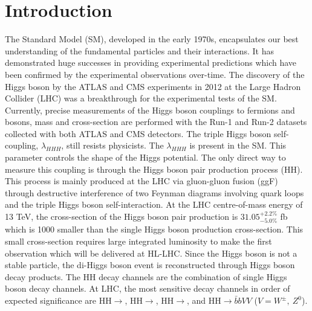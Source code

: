 \chapter{Introduction}
\label{Intro}
The Standard Model (SM), developed in the early 1970s, encapsulates our best understanding of the fundamental particles and their interactions. It has demonstrated huge successes in providing experimental predictions which have been confirmed by the experimental observations over-time. The discovery of the Higgs boson by the ATLAS and CMS experiments in 2012 at the Large Hadron Collider (LHC) was a breakthrough for the experimental tests of the SM. Currently, precise measurements of the Higgs boson couplings to fermions and bosons, mass and cross-section are performed with the Run-1 and Run-2 datasets collected with both ATLAS and CMS detectors. The triple Higgs boson self-coupling, $\lambda_{HHH}$, still resists physicists. The $\lambda_{HHH}$ is present in the SM. This parameter controls the shape of the Higgs potential. The only direct way to measure this coupling is through the Higgs boson pair production process (HH). This process is mainly produced at the LHC via gluon-gluon fusion (ggF) through destructive interference of two Feynman diagrams involving quark loops and the triple Higgs boson self-interaction. At the LHC centre-of-mass energy of 13 TeV, the cross-section of the Higgs boson pair production is $31.05_{-5.0\%}^{+2.2\%}$ fb which is 1000 smaller than the single Higgs boson production cross-section. This small cross-section requires large integrated luminosity to make the first observation which will be delivered at HL-LHC. Since the Higgs boson is not a stable particle, the di-Higgs boson event is reconstructed through Higgs boson decay products. The HH decay channels are the combination of single Higgs boson decay channels. At LHC, the most sensitive decay channels in order of expected significance are HH$\to$\bbtt, HH$\to$\bbyy,  HH$\to$\bbbb, and HH$\to\bar{b}bVV$ ($V=W^{\pm},\ Z^0$). \\
